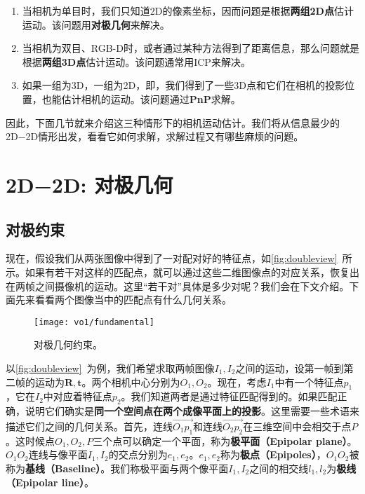 \begin{enumerate}
	\item 当相机为单目时，我们只知道2D的像素坐标，因而问题是根据\textbf{两组2D点}估计运动。该问题用\textbf{对极几何}来解决。
	\item 当相机为双目、RGB-D时，或者通过某种方法得到了距离信息，那么问题就是根据\textbf{两组3D点}估计运动。该问题通常用ICP来解决。
	\item 如果一组为3D，一组为2D，即，我们得到了一些3D点和它们在相机的投影位置，也能估计相机的运动。该问题通过\textbf{PnP}求解。
\end{enumerate}

因此，下面几节就来介绍这三种情形下的相机运动估计。我们将从信息最少的2D−2D情形出发，看看它如何求解，求解过程又有哪些麻烦的问题。

\section{2D−2D: 对极几何}
\label{sec:epipolar-geometry}

\subsection{对极约束}

现在，假设我们从两张图像中得到了一对配对好的特征点，如\autoref{fig:doubleview}~所示。如果有若干对这样的匹配点，就可以通过这些二维图像点的对应关系，恢复出在两帧之间摄像机的运动。这里“若干对”具体是多少对呢？我们会在下文介绍。下面先来看看两个图像当中的匹配点有什么几何关系。

\begin{figure}[!htp]
	\centering
	\texttt{[image: vo1/fundamental]}
	\caption{对极几何约束。}
	\label{fig:doubleview}
\end{figure}

以\autoref{fig:doubleview}~为例，我们希望求取两帧图像$I_{1}, I_{2}$之间的运动，设第一帧到第二帧的运动为$\bm{R}, \bm{t}$。两个相机中心分别为$O_{1}, O_{2}$。现在，考虑$I_{1}$中有一个特征点$p_{1}$，它在$I_{2}$中对应着特征点$p_{2}$。我们知道两者是通过特征匹配得到的。如果匹配正确，说明它们确实是\textbf{同一个空间点在两个成像平面上的投影}。这里需要一些术语来描述它们之间的几何关系。首先，连线$\overrightarrow{O_{1}p_{1}}$和连线$\overrightarrow{O_{2}p_{2}}$在三维空间中会相交于点$P$。这时候点$O_{1},O_{2},P$三个点可以确定一个平面，称为\textbf{极平面（Epipolar plane）}。$O_{1}O_{2}$连线与像平面$I_{1},I_{2}$的交点分别为$e_{1},e_{2}$。$e_{1},e_{2}$称为\textbf{极点（Epipoles）}，$O_{1}O_{2}$被称为\textbf{基线（Baseline）}。我们称极平面与两个像平面$I_{1}, I_{2}$之间的相交线$l_{1},l_{2}$为\textbf{极线（Epipolar line）}。

